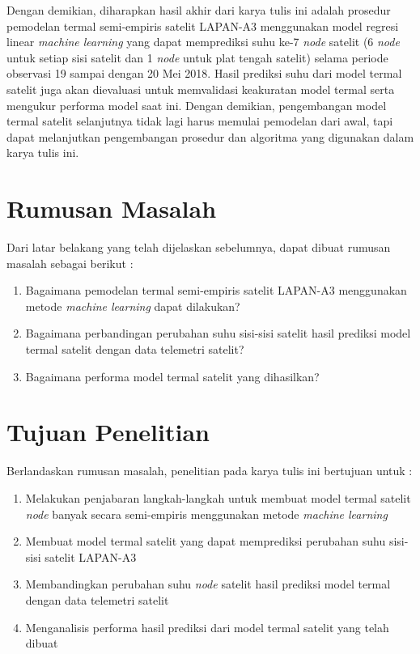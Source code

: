 Dengan demikian, diharapkan hasil akhir dari karya tulis ini adalah prosedur
pemodelan termal semi-empiris satelit LAPAN-A3 menggunakan model regresi linear
\textit{machine learning} yang dapat memprediksi suhu ke-7 \textit{node}
satelit (6 \textit{node} untuk setiap sisi satelit dan 1 \textit{node} untuk
plat tengah satelit) selama periode observasi 19 sampai dengan 20 Mei 2018.
Hasil prediksi suhu dari model termal satelit juga akan dievaluasi untuk
memvalidasi keakuratan model termal serta mengukur performa model saat ini. Dengan demikian, pengembangan model termal satelit selanjutnya tidak lagi harus memulai pemodelan dari awal, tapi dapat melanjutkan pengembangan prosedur dan algoritma yang digunakan dalam karya tulis ini.

\section{Rumusan Masalah}

Dari latar belakang yang telah dijelaskan sebelumnya, dapat dibuat rumusan masalah sebagai berikut :

\begin{enumerate}
\item Bagaimana pemodelan termal semi-empiris satelit LAPAN-A3 menggunakan metode \textit{machine learning} dapat dilakukan?
\item Bagaimana perbandingan perubahan suhu sisi-sisi satelit hasil prediksi model termal satelit dengan data telemetri satelit?
\item Bagaimana performa model termal satelit yang dihasilkan?
\end{enumerate}

\section{Tujuan Penelitian}

Berlandaskan rumusan masalah, penelitian pada karya tulis ini bertujuan untuk :

\begin{enumerate}
\item Melakukan penjabaran langkah-langkah untuk membuat model termal satelit \textit{node} banyak secara semi-empiris menggunakan metode \textit{machine learning}
\item Membuat model termal satelit yang dapat memprediksi perubahan suhu sisi-sisi satelit LAPAN-A3
\item Membandingkan perubahan suhu \textit{node} satelit hasil prediksi model termal dengan data telemetri satelit
\item Menganalisis performa hasil prediksi dari model termal satelit yang telah dibuat
\end{enumerate}

